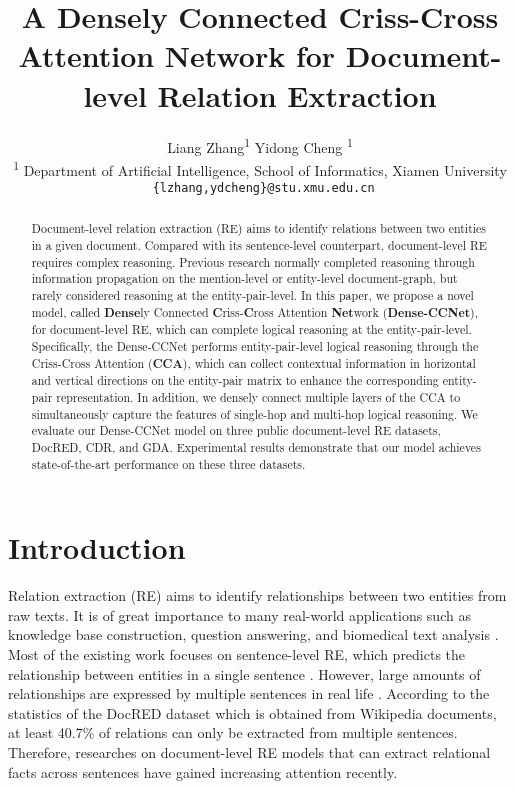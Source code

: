 \documentclass[11pt]{article}
\title{A Densely Connected Criss-Cross Attention Network for Document-level Relation Extraction}
\author {
Liang Zhang\textsuperscript{\rm 1} 
    Yidong Cheng \textsuperscript{\rm 1}\\
    \textsuperscript{\rm 1} Department of Artificial Intelligence, School of Informatics, Xiamen University\\
    \texttt{ \{lzhang,ydcheng\}@stu.xmu.edu.cn} \\
}
\begin{document}
\maketitle

\begin{abstract}
Document-level relation extraction (RE) aims to identify relations between two entities in a given document. Compared with its sentence-level counterpart, document-level RE requires complex reasoning. Previous research normally completed reasoning through information propagation on the mention-level or entity-level document-graph, but rarely considered reasoning at the entity-pair-level.
In this paper, we propose a novel model, called \textbf{Dense}ly Connected \textbf{C}riss-\textbf{C}ross Attention \textbf{Net}work (\textbf{Dense-CCNet}), for document-level RE, which can complete logical reasoning at the entity-pair-level. Specifically, the Dense-CCNet performs entity-pair-level logical reasoning through the Criss-Cross Attention (\textbf{CCA}), which can collect contextual information in horizontal and vertical directions on the entity-pair matrix to enhance the corresponding entity-pair representation. 
In addition, we densely connect multiple layers of the CCA to simultaneously capture the features of single-hop and multi-hop logical reasoning.
We evaluate our Dense-CCNet model on three public document-level RE datasets, DocRED, CDR, and GDA. Experimental results demonstrate that our model achieves state-of-the-art performance on these three datasets. 
\end{abstract}

\section{Introduction}
Relation extraction (RE) aims to identify relationships between two entities from raw texts. It is of great importance to many real-world applications such as knowledge base construction, question answering, and biomedical text analysis \cite{c:101}. Most of the existing work focuses on sentence-level RE, which predicts the relationship between entities in a single sentence \cite{c:102,c:103}. 
However, large amounts of relationships are expressed by multiple sentences in real life \cite{c:104}. According to the statistics of the DocRED \cite{c:104} dataset which is obtained from Wikipedia documents, at least 40.7\% of relations can only be extracted from multiple sentences. 
Therefore, researches on document-level RE models that can extract relational facts across sentences have gained increasing attention recently.
\end{document}
